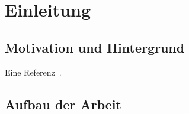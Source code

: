 \chapter{Einleitung}
\section{Motivation und Hintergrund}
Eine Referenz~\cite{AggarwalV88}.
\section{Aufbau der Arbeit}